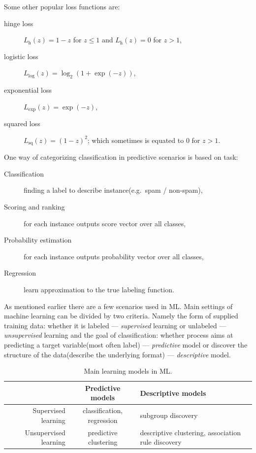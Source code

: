 \documentclass[12pt, a4paper, pdflatex]{report}
\begin{document}
Some other popular loss functions are:
\begin{description}
\item[hinge loss] $L_{\text{h}} (z) = 1 - z$ for $z \leq 1$ and $L_{\text{h}} (z) = 0$ for $z > 1$,
\item[logistic loss] $L_{\text{log}} (z) = \log_2 (1 + \exp(-z))$,
\item[exponential loss] $L_{\text{exp}} (z) = \exp(-z)$,
\item[squared loss] $L_{\text{sq}} (z) = (1 - z)^2$; which sometimes is equated to $0$ for $z>1$.\\
\end{description}

One way of categorizing classification in predictive scenarios is based on task:
\begin{description}
\item[Classification] finding a label to describe instance(e.g.\ spam / non-spam),
\item[Scoring and ranking] for each instance outputs score vector over all classes,
\item[Probability estimation] for each instance outputs probability vector over all classes,
\item[Regression] learn approximation to the true labeling function.\\
\end{description}

As mentioned earlier there are a few scenarios used in ML. Main settings of machine learning can be divided by two criteria. Namely the form of supplied training data: whether it is labeled --- \emph{supervised} learning or unlabeled --- \emph{unsupervised} learning and the goal of classification: whether process aims at predicting a target variable(most often label) --- \emph{predictive} model or discover the structure of the data(describe the underlying format) --- \emph{descriptive} model.\\

\begin{table}[htbp]
  \begin{tabular}{ r | c p{5cm} }
                         & Predictive models          & Descriptive models \\
    \hline
    Supervised learning   & classification, regression & subgroup discovery \\
    Unsupervised learning & predictive clustering      & descriptive clustering, association rule discovery \\
  \end{tabular}~\\[0.1cm]
  \caption{Main learning models in ML.\label{fig:learning_models}}
\end{table}~\\
\end{document}
